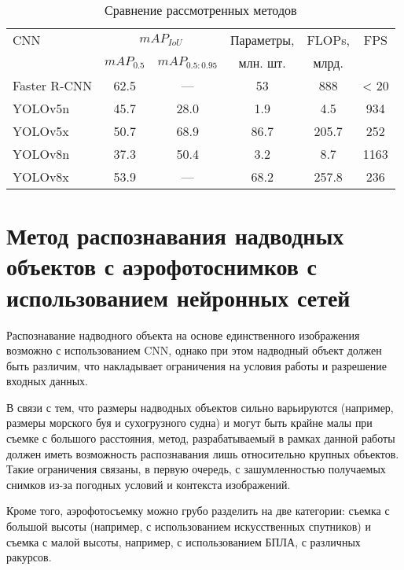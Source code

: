 \begin{table}[!h]
    \small
    \begin{center}
        \caption{Сравнение рассмотренных методов}
        \label{tbl:cmp-by-ap}
        \begin{tabular}{|l|cc|c|c|c|}
            \hline
            CNN & \multicolumn{2}{c|}{$mAP_{IoU}$} & Параметры, & FLOPs, & FPS \\
                & $mAP_{0.5}$ & $mAP_{0.5:0.95}$    & млн. шт.   & млрд.  & \\\hline

            Faster R-CNN & 62.5 & ---  & 53   & 888   & < 20 \\
            YOLOv5n      & 45.7 & 28.0 & 1.9  & 4.5   & 934 \\
            YOLOv5x      & 50.7 & 68.9 & 86.7 & 205.7 & 252 \\
            YOLOv8n      & 37.3 & 50.4 & 3.2  & 8.7   & 1163 \\
            YOLOv8x      & 53.9 & ---  & 68.2 & 257.8 & 236 \\
            \hline
        \end{tabular}
    \end{center}
\end{table}


\section{Метод распознавания надводных объектов с аэрофотоснимков с использованием нейронных сетей}

Распознавание надводного объекта на основе единственного изображения возможно с использованием CNN, однако при этом надводный объект должен быть различим, что накладывает ограничения на условия работы и разрешение входных данных.

В связи с тем, что размеры надводных объектов сильно варьируются (например, размеры морского буя и сухогрузного судна) и могут быть крайне малы при съемке с большого расстояния, метод, разрабатываемый в рамках данной работы должен иметь возможность распознавания лишь относительно крупных объектов. Такие ограничения связаны, в первую очередь, с зашумленностью получаемых снимков из-за погодных условий и контекста изображений.

Кроме того, аэрофотосъемку можно грубо разделить на две категории: съемка с большой высоты (например, с использованием искусственных спутников) и съемка с малой высоты, например, с использованием БПЛА, с различных ракурсов.

